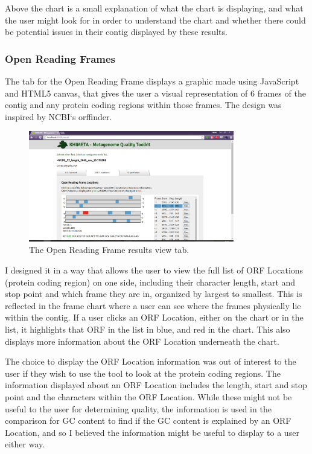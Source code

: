 Above the chart is a small explanation of what the chart is displaying, and what the user might look for in order to understand the chart and whether there could be potential issues in their contig displayed by these results.

\subsubsection{Open Reading Frames}
The tab for the Open Reading Frame displays a graphic made using JavaScript and HTML5 canvas, that gives the user a visual representation of 6 frames of the contig and any protein coding regions within those frames. The design was inspired by NCBI`s orffinder\cite{orffinder}.

\begin{figure}[H]
	\centering
\includegraphics[width=0.8\textwidth]{images/ui6}
\caption{The Open Reading Frame results view tab.}
\end{figure}

I designed it in a way that allows the user to view the full list of ORF Locations (protein coding region) on one side, including their character length, start and stop point and which frame they are in, organized by largest to smallest. This is reflected in the frame chart where a user can see where the frames physically lie within the contig. If a user clicks an ORF Location, either on the chart or in the list, it highlights that ORF in the list in blue, and red in the chart. This also displays more information about the ORF Location underneath the chart.

The choice to display the ORF Location information was out of interest to the user if they wish to use the tool to look at the protein coding regions. The information displayed about an ORF Location includes the length, start and stop point and the characters within the ORF Location. While these might not be useful to the user for determining quality, the information is used in the comparison for GC content to find if the GC content is explained by an ORF Location, and so I believed the information might be useful to display to a user either way.

